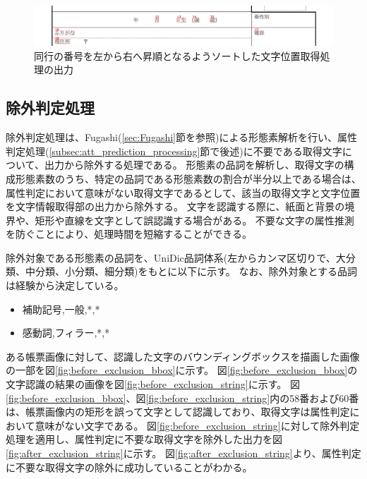 \begin{figure}[t]
    \begin{center}
        \includegraphics[width=15cm]{image/04-implementation/after_sorted_string.png}
        \caption{同行の番号を左から右へ昇順となるようソートした文字位置取得処理の出力}
        \label{fig:after_sorted_string}
    \end{center}
\end{figure}


\subsection{除外判定処理}\label{subsec:exclusion_judgement_processing}
除外判定処理は、Fugashi(\ref{sec:Fugashi}節を参照)による形態素解析を行い、属性判定処理(\ref{subsec:att_prediction_processing}節で後述)に不要である取得文字について、出力から除外する処理である。
形態素の品詞を解析し、取得文字の構成形態素数のうち、特定の品詞である形態素数の割合が半分以上である場合は、属性判定において意味がない取得文字であるとして、該当の取得文字と文字位置を文字情報取得部の出力から除外する。
文字を認識する際に、紙面と背景の境界や、矩形や直線を文字として誤認識する場合がある。
不要な文字の属性推測を防ぐことにより、処理時間を短縮することができる。

除外対象である形態素の品詞を、UniDic品詞体系(左からカンマ区切りで、大分類、中分類、小分類、細分類)をもとに以下に示す。
なお、除外対象とする品詞は経験から決定している。

\begin{itemize}
    \item 補助記号,一般,*,*
    \item 感動詞,フィラー,*,*
\end{itemize}

ある帳票画像に対して、認識した文字のバウンディングボックスを描画した画像の一部を図\ref{fig:before_exclusion_bbox}に示す。
図\ref{fig:before_exclusion_bbox}の文字認識の結果の画像を図\ref{fig:before_exclusion_string}に示す。
図\ref{fig:before_exclusion_bbox}、図\ref{fig:before_exclusion_string}内の58番および60番は、帳票画像内の矩形を誤って文字として認識しており、取得文字は属性判定において意味がない文字である。
図\ref{fig:before_exclusion_string}に対して除外判定処理を適用し、属性判定に不要な取得文字を除外した出力を図\ref{fig:after_exclusion_string}に示す。
図\ref{fig:after_exclusion_string}より、属性判定に不要な取得文字の除外に成功していることがわかる。

